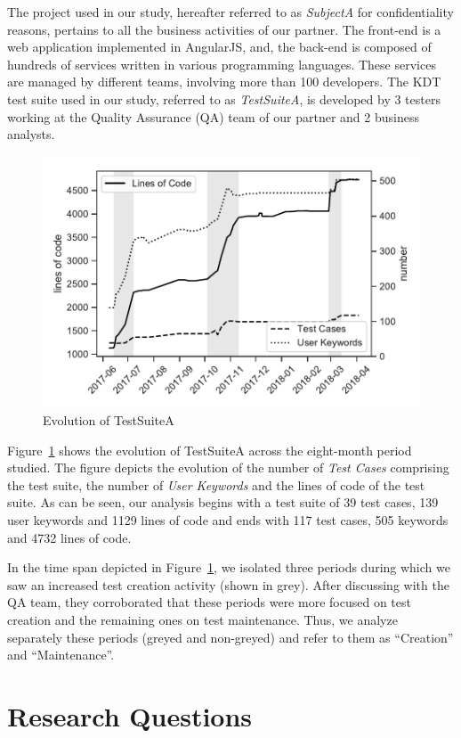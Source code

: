 The project used in our study, hereafter referred to as \emph{SubjectA} for confidentiality reasons, pertains to all the business activities of our partner. The front-end is a web application implemented in AngularJS, and, the back-end is composed of hundreds of services written in various programming languages. These services are managed by different teams, involving more than 100 developers. The KDT test suite used in our study, referred to as \emph{TestSuiteA}, is developed by 3 testers working at the Quality Assurance (QA) team of our partner and 2 business analysts.

\begin{figure}[t!]
  \centering
  \includegraphics[width=0.7\columnwidth]{figures/evolution/project_evolution.pdf}
  \caption{Evolution of TestSuiteA}
  \label{fig:project_evolution}%
\end{figure}

Figure~\ref{fig:project_evolution} shows the evolution of TestSuiteA across the eight-month period studied. The figure depicts the evolution of the number of \emph{Test Cases} comprising the test suite, the number of \emph{User Keywords} and the lines of code of the test suite. As can be seen, our analysis begins with a test suite of 39 test cases, 139 user keywords and 1129 lines of code and ends with 117 test cases, 505 keywords and 4732 lines of code.

In the time span depicted in Figure~\ref{fig:project_evolution}, we isolated three periods during which we saw an increased test creation activity (shown in grey). After discussing with the QA team, they corroborated that these periods were more focused on test creation and the remaining ones on test maintenance. Thus, we analyze separately these periods (greyed and non-greyed) and refer to them as ``Creation'' and ``Maintenance''.

\section{Research Questions}

